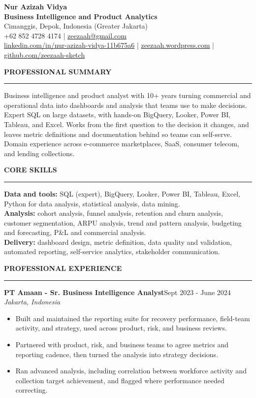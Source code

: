 ﻿\documentclass[10.5pt,a4paper]{article}
\newcommand{\cvsection}[1]{%
  \vspace{8pt}%
  {\normalsize\bfseries\MakeUppercase{#1}}\\[-7pt]
  \rule{\textwidth}{0.6pt}\vspace{2pt}%
}
\newcommand{\role}[3]{%
  \vspace{3pt}%
  {\bfseries #1}\hfill{\small #3}\\
  {\itshape #2}\par\vspace{1pt}%
}
\begin{document}
{\LARGE\bfseries Nur Azizah Vidya}\\[2pt]
{\large\bfseries Business Intelligence and Product Analytics}\\[4pt]
{\small
Cimanggis, Depok, Indonesia (Greater Jakarta)\\
+62 852 4728 4174 | \href{mailto:zeezaah@gmail.com}{zeezaah@gmail.com}\\
\href{https://www.linkedin.com/in/nur-azizah-vidya-11b675a6/}{linkedin.com/in/nur-azizah-vidya-11b675a6} |
\href{https://zeezaah.wordpress.com}{zeezaah.wordpress.com} |
\href{https://github.com/zeezaah-sketch}{github.com/zeezaah-sketch}
}

\cvsection{Professional Summary}
Business intelligence and product analyst with 10+ years turning commercial and operational data into dashboards and analysis that teams use to make decisions. Expert SQL on large datasets, with hands-on BigQuery, Looker, Power BI, Tableau, and Excel. Works from the first question to the decision it changes, and leaves metric definitions and documentation behind so teams can self-serve. Domain experience across e-commerce marketplaces, SaaS, consumer telecom, and lending collections.

\cvsection{Core Skills}
\textbf{Data and tools:} SQL (expert), BigQuery, Looker, Power BI, Tableau, Excel, Python for data analysis, statistical analysis, data mining.\\
\textbf{Analysis:} cohort analysis, funnel analysis, retention and churn analysis, customer segmentation, ARPU analysis, trend and pattern analysis, budgeting and forecasting, P\&L and commercial analysis.\\
\textbf{Delivery:} dashboard design, metric definition, data quality and validation, automated reporting, self-service analytics, stakeholder communication.

\cvsection{Professional Experience}

\role{PT Amaan - Sr. Business Intelligence Analyst}{Jakarta, Indonesia}{Sept 2023 - June 2024}
\begin{itemize}
  \item Built and maintained the reporting suite for recovery performance, field-team activity, and strategy, used across product, risk, and business reviews.
  \item Partnered with product, risk, and business teams to agree metrics and reporting cadence, then turned the analysis into strategy decisions.
  \item Ran advanced analysis, including correlation between workforce activity and collection target achievement, and flagged where performance needed correcting.
\end{itemize}
\end{document}
